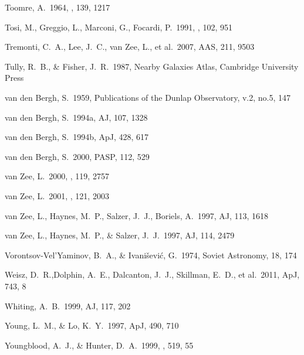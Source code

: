 \documentclass[12pt,onecolumn]{emulateapj}
\begin{document}
\begin{thebibliography}{}
Toomre, A.\ 1964, \apj, 139, 1217 

Tosi, M., Greggio, L., Marconi, G., Focardi, P.\ 1991, \aj, 102, 951 

Tremonti, C.~A., Lee, J.~C., van Zee, L., et al.\ 2007, AAS, 211, 9503

Tully, R.~B., \& Fisher, J.~R.\ 1987, Nearby Galaxies Atlas, Cambridge
University Press
 
van den Bergh, S.\ 1959, Publications of the Dunlap Observatory, v.2, no.5, 147

van den Bergh, S.\ 1994a, AJ, 107, 1328

van den Bergh, S.\ 1994b, ApJ, 428, 617

van den Bergh, S.\ 2000, PASP, 112, 529

van Zee, L.\ 2000, \aj , 119, 2757

van Zee, L.\ 2001, \aj , 121, 2003

van Zee, L., Haynes, M.~P., Salzer, J.~J., Boriels, A.\ 1997, AJ, 113, 1618

van Zee, L., Haynes, M.~P., \& Salzer, J.~J.\ 1997, AJ, 114, 2479

Vorontsov-Vel'Yaminov, B.~A., \& Ivani{\v s}evi{\'c}, G.\ 1974, Soviet Astronomy, 18, 174 

Weisz, D.~R.,Dolphin, A.~E., Dalcanton, J.~J., Skillman, E.~D., et al.\ 2011, ApJ, 743, 8

Whiting, A.~B.\ 1999, AJ, 117, 202

Young, L.~M., \& Lo, K.~Y.\ 1997, ApJ, 490, 710
 
Youngblood, A.~J., \& Hunter, D.~A.\ 1999, \apj , 519, 55

\end{thebibliography}
\end{document}
